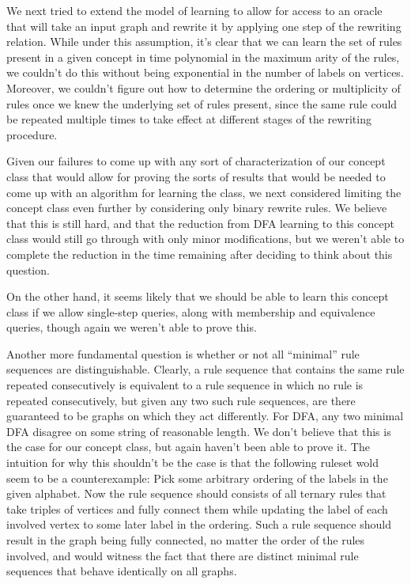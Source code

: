 \documentclass[]{article}
\begin{document}
We next tried to extend the model of learning to allow for access to an oracle
that will take an input graph and rewrite it by applying one step of the
rewriting relation. While under this assumption, it's clear that we can learn
the set of rules present in a given concept in time polynomial in the maximum
arity of the rules, we couldn't do this without being exponential in the number
of labels on vertices. Moreover, we couldn't figure out how to determine the
ordering or multiplicity of rules once we knew the underlying set of rules
present, since the same rule could be repeated multiple times to take effect at
different stages of the rewriting procedure.

Given our failures to come up with any sort of characterization of our concept
class that would allow for proving the sorts of results that would be needed to
come up with an algorithm for learning the class, we next considered limiting
the concept class even further by considering only binary rewrite rules. We
believe that this is still hard, and that the reduction from DFA learning to
this concept class would still go through with only minor modifications, but we
weren't able to complete the reduction in the time remaining after deciding to
think about this question.

On the other hand, it seems likely that we should be able to learn this concept
class if we allow single-step queries, along with membership and equivalence
queries, though again we weren't able to prove this.

Another more fundamental question is whether or not all ``minimal'' rule
sequences are distinguishable. Clearly, a rule sequence that contains the same
rule repeated consecutively is equivalent to a rule sequence in which no rule is
repeated consecutively, but given any two such rule sequences, are there
guaranteed to be graphs on which they act differently. For DFA, any two minimal
DFA disagree on some string of reasonable length. We don't believe that this is
the case for our concept class, but again haven't been able to prove it. The
intuition for why this shouldn't be the case is that the following ruleset wold
seem to be a counterexample: Pick some arbitrary ordering of the labels in the
given alphabet. Now the rule sequence should consists of all ternary rules that
take triples of vertices and fully connect them while updating the label of each
involved vertex to some later label in the ordering. Such a rule sequence should
result in the graph being fully connected, no matter the order of the rules
involved, and would witness the fact that there are distinct minimal rule
sequences that behave identically on all graphs.
\end{document}
